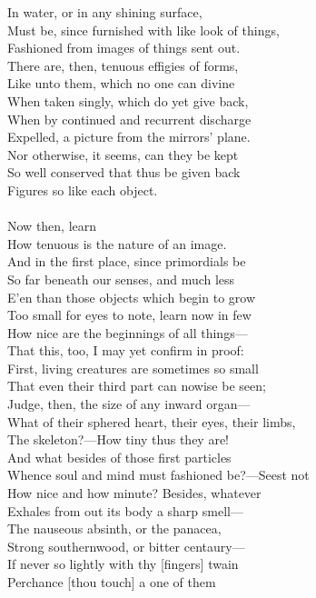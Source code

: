 In water, or in any shining surface,\\
Must be, since furnished with like look of things,\\
Fashioned from images of things sent out.\\
There are, then, tenuous effigies of forms,\\
Like unto them, which no one can divine\\
When taken singly, which do yet give back,\\
When by continued and recurrent discharge\\
Expelled, a picture from the mirrors' plane.\\
Nor otherwise, it seems, can they be kept\\
So well conserved that thus be given back\\
Figures so like each object.\\
\\
Now then, learn\\
How tenuous is the nature of an image.\\
And in the first place, since primordials be\\
So far beneath our senses, and much less\\
E'en than those objects which begin to grow\\
Too small for eyes to note, learn now in few\\
How nice are the beginnings of all things—\\
That this, too, I may yet confirm in proof:\\
First, living creatures are sometimes so small\\
That even their third part can nowise be seen;\\
Judge, then, the size of any inward organ—\\
What of their sphered heart, their eyes, their limbs,\\
The skeleton?—How tiny thus they are!\\
And what besides of those first particles\\
Whence soul and mind must fashioned be?—Seest not\\
How nice and how minute? Besides, whatever\\
Exhales from out its body a sharp smell—\\
The nauseous absinth, or the panacea,\\
Strong southernwood, or bitter centaury—\\
If never so lightly with thy [fingers] twain\\
Perchance [thou touch] a one of them

